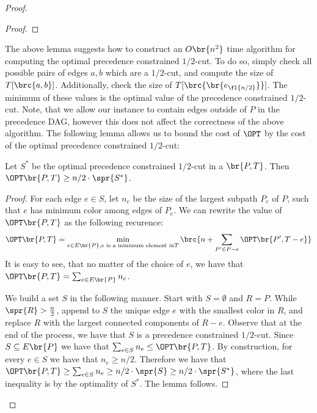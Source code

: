 \begin{proof}
\begin{proof}
\end{proof}
The above lemma suggests how to construct an $O\br{n^2}$ time algorithm for computing the optimal precedence constrained $1/2$-cut. To do so, simply check all possible pairs of edges $a, b$ which are a $1/2$-cut, and compute the size of $T[\brc{a, b}]$. Additionally, check the size of $T[\brc{\br{e_{\fl{n/2}}}}]$. The minimum of these values is the optimal value of the precedence constrained $1/2$-cut. Note, that we allow our instance to contain edges outside of $P$ in the precedence DAG, however this does not affect the correctness of the above algorithm. The following lemma allows us to bound the cost of $\OPT$ by the cost of the optimal precedence constrained $1/2$-cut:
\begin{lemma}\label{ea:lemma:half_cut_cost}
    Let $S^*$ be the optimal precedence constrained $1/2$-cut in a $\br{P,T}$. Then $\OPT\br{P, T}\geq n/2\cdot \spr{S^*}$.
\end{lemma}
\begin{proof}
    For each edge $e\in S$, let $n_e$ be the size of the largest subpath $P_e$ of $P$, such that $e$ has minimum color among edges of $P_e$. We can rewrite the value of $\OPT\br{P, T}$ as the following recurence:
\begin{align*}
\OPT\br{P, T} = \min_{e\in E\br{P}, e \text{ is a minimum element in} T}\brc{n + \sum_{P'\in P-e}\OPT\br{P', T-e}}
\end{align*}
It is easy to see, that no matter of the choice of $e$, we have that $\OPT\br{P, T}=\sum_{e\in E\br{P}}n_e$. 

We build a set $S$ in the following manner. Start with $S=\emptyset$ and $R=P$. While $\spr{R}>\frac{n}{2}$, append to $S$ the unique edge $e$ with the smallest color in $R$, and replace $R$ with the largest connected components of $R-e$. Observe that at the end of the process, we have that $S$ is a precedence constrained $1/2$-cut. Since $S\subseteq E\br{P}$ we have that $\sum_{e\in S}n_e\leq \OPT\br{P, T}$. By construction, for every $e\in S$ we have that $n_e\geq n/2$. Therefore we have that $\OPT\br{P, T}\geq \sum_{e\in S}n_e\geq n/2\cdot \spr{S}\geq n/2\cdot \spr{S^*}$, where the last inequality is by the optimality of $S^*$. The lemma follows.
\end{proof}


\end{proof}
